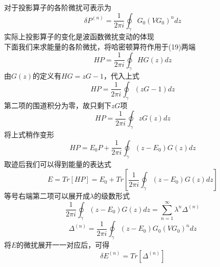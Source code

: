 \documentclass[12pt, a4paper, oneside]{ctexart}
\begin{document}
对于投影算子的各阶微扰可表示为
\begin{equation}
    \delta P^{(n)}=\frac{1}{2\pi i}\oint _{\gamma}G_0(V G_0)^ndz
\end{equation}
实际上投影算子的变化是波函数微扰变动的体现\\
下面我们来求能量的各阶微扰，将哈密顿算符作用于(19)两端
\begin{equation}
    HP=\frac{1}{2\pi i}\oint _{\gamma}HG(z)dz
\end{equation}
由$G(z)$的定义有$HG=zG-1$，代入上式
\begin{equation}
    HP=\frac{1}{2\pi i}\oint _{\gamma}(zG-1)dz
\end{equation}
第二项的围道积分为零，故只剩下$zG$项
\begin{equation}
    HP=\frac{1}{2\pi i}\oint _{\gamma}zG(z)dz
\end{equation}
将上式稍作变形
\begin{equation}
    HP=E_0P+\frac{1}{2\pi i}\oint _{\gamma}(z-E_0)G(z)dz
\end{equation}
取迹后我们可以得到能量的表达式
\begin{equation}
    E=Tr[HP]=E_0+Tr[\frac{1}{2\pi i}\oint _{\gamma}(z-E_0)G(z)dz]
\end{equation}
等号右端第二项可以展开成$\lambda$的级数形式
\begin{equation}
    \frac{1}{2\pi i}\oint _{\gamma}(z-E_0)G(z)dz=\sum_{n=1}^{\infty}\lambda^n \Delta^{(n)}
\end{equation}
\begin{equation}
    \Delta^{(n)}=\frac{1}{2\pi i}\oint _{\gamma}(z-E_0)G_0(VG_0)^ndz
\end{equation}
将$E$的微扰展开一一对应后，可得
\begin{equation}
    \delta E^{(n)}= Tr[\Delta^{(n)}]
\end{equation}
\end{document}
